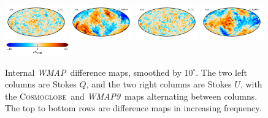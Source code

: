 \documentclass[twocolumn]{../../common/aa}
\def\WMAP{\emph{WMAP}}
\def\WMAPnine{\emph{WMAP9}}
\newcommand{\cosmoglobe}{\textsc{Cosmoglobe}}
\begin{document}
\begin{figure}
	\includegraphics[width=0.24\textwidth]{figures/W_deltaQ.pdf}
	\includegraphics[width=0.24\textwidth]{figures/W_W_deltaQ.pdf}
	\includegraphics[width=0.24\textwidth]{figures/W_deltaU.pdf}
	\includegraphics[width=0.24\textwidth]{figures/W_W_deltaU.pdf}
        \includegraphics[width=0.25\textwidth]{figures/cbar_10uK.pdf}
	\caption{Internal \WMAP\ difference maps, smoothed by $10^\circ$. The two left columns are Stokes $Q$, and the two right columns are Stokes $U$, with the \cosmoglobe\ and \WMAPnine\ maps alternating between columns. The top to bottom rows are difference maps in increasing frequency.}
	\label{fig:internal_diff}


\end{figure}
\end{document}
